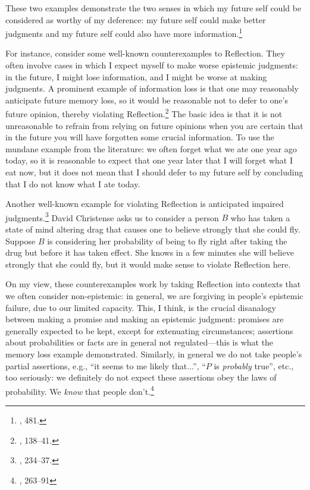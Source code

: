 These two examples demonstrate the two senses in which my future self
could be considered as worthy of my deference: my future self could make
better judgments and my future self could also have more
information.\footnote{\cite{elgadisagreement}, 481.}

For instance, consider some well-known counterexamples to Reflection.
They often involve cases in which I expect myself to make worse
epistemic judgments: in the future, I might lose information, and I
might be worse at making judgments. A prominent example of information
loss is that one may reasonably anticipate future memory loss, so it
would be reasonable not to defer to one's future opinion, thereby
violating Reflection.\footnote{\cite{twoprinciplesofbayesian}, 138--41.} The basic idea is that it is not unreasonable to
refrain from relying on future opinions when you are certain that in the
future you will have forgotten some crucial information. To use the
mundane example from the literature: we often forget what we ate one
year ago today, so it is reasonable to expect that one year later that I
will forget what I eat now, but it does not mean that I should defer to
my future self by concluding that I do not know what I ate today.

Another well-known example for violating
Reflection is anticipated impaired judgments.\footnote{\cite{cleverbookies}, 234--37.} David Christense  asks us to
consider a person \(B\) who has taken a state of mind altering drag that
causes one to believe strongly that she could fly. Suppose \(B\) is
considering her probability of being to fly right after taking the drug
but before it has taken effect. She knows in a few minutes she will
believe strongly that she could fly, but it would make sense to violate
Reflection here.

On my view, these counterexamples work by taking Reflection into contexts that we often consider non-epistemic: in general, we are  forgiving in people's epistemic failure, due to our limited capacity. This, I think, is the crucial disanalogy between making a promise and making an epistemic judgment: promises are generally expected to be kept, except for extenuating circumstances; assertions about probabilities or facts are in general not regulated---this is what the memory loss example demonstrated. Similarly, in general we do not take people's partial assertions, e.g., ``it seems to me likely that...'', ``$P$ is \emph{probably} true'', etc., too seriously: we definitely do not expect these assertions obey the laws of probability. We \emph{know} that people don't.\footnote{\cite{prospect}, 263--91}

